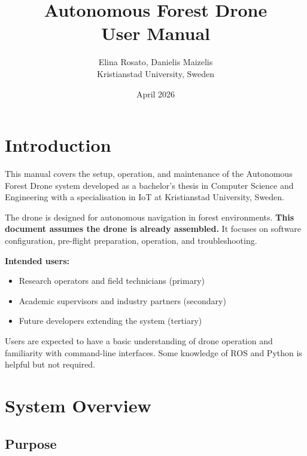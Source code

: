 \documentclass{article}
\begin{document}
\title{Autonomous Forest Drone\\[0.4em]\large User Manual}
\date{April 2026}
\author{Elina Rosato, Danielis Maizelis\\[0.3em]
\small Kristianstad University, Sweden}

\maketitle
\newpage

\tableofcontents
\newpage

\section{Introduction}

This manual covers the setup, operation, and maintenance of the Autonomous Forest Drone system developed as a bachelor's thesis in Computer Science and Engineering with a specialisation in IoT at Kristianstad University, Sweden.

The drone is designed for autonomous navigation in forest environments. \textbf{This document assumes the drone is already assembled.} It focuses on software configuration, pre-flight preparation, operation, and troubleshooting.

\textbf{Intended users:}
\begin{itemize}
    \item Research operators and field technicians (primary)
    \item Academic supervisors and industry partners (secondary)
    \item Future developers extending the system (tertiary)
\end{itemize}

Users are expected to have a basic understanding of drone operation and familiarity with command-line interfaces. Some knowledge of ROS and Python is helpful but not required.

\section{System Overview}

\subsection{Purpose}
\end{document}
